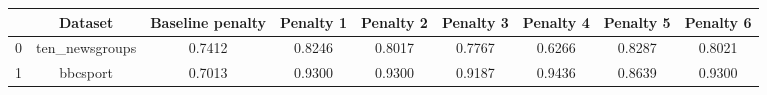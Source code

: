 \begin{tabular}{|l|c|c|c|c|c|c|c|c|}
\hline
 & Dataset & Baseline penalty & Penalty 1 & Penalty 2 & Penalty 3 & Penalty 4 & Penalty 5 & Penalty 6 \\
\hline
0 & ten_newsgroups & 0.7412 & 0.8246 & 0.8017 & 0.7767 & 0.6266 & 0.8287 & 0.8021 \\
1 & bbcsport & 0.7013 & 0.9300 & 0.9300 & 0.9187 & 0.9436 & 0.8639 & 0.9300 \\
\hline
\end{tabular}
